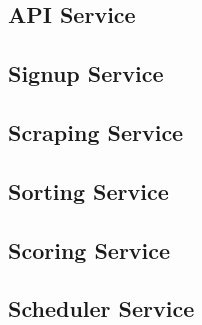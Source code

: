 \subsection{API Service}


\subsection{Signup Service}


\subsection{Scraping Service}


\subsection{Sorting Service}


\subsection{Scoring Service}


\subsection{Scheduler Service}


